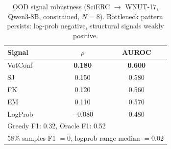 \documentclass[11pt,a4paper]{article}
\newcommand{\bmark}[1]{\textbf{#1}}
\begin{document}
\begin{table}[h]
\centering
\caption{OOD signal robustness (SciERC $\to$ WNUT-17, Qwen3-8B, constrained, $N\!=\!8$). Bottleneck pattern persists: log-prob negative, structural signals weakly positive.}
\label{tab:ood}
\small
\begin{tabular}{l cc}
\toprule
Signal & $\rho$ & AUROC \\
\midrule
VotConf & \bmark{0.180} & \bmark{0.600} \\
SJ      & 0.150 & 0.580 \\
FK      & 0.120 & 0.560 \\
EM      & 0.110 & 0.570 \\
LogProb & $-$0.080 & 0.480 \\
\midrule
\multicolumn{3}{l}{\small Greedy F1: 0.32, Oracle F1: 0.52} \\
\multicolumn{3}{l}{\small 58\% samples F1 $= 0$, logprob range median $= 0.02$} \\
\bottomrule
\end{tabular}
\end{table}
\end{document}
